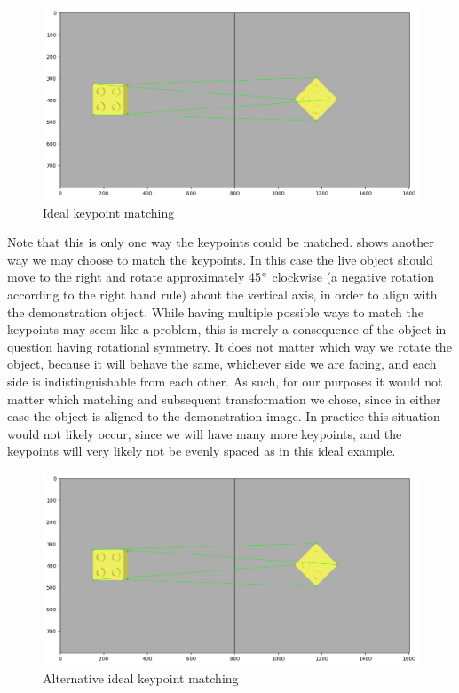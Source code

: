 \begin{figure}[h]
    \centering
    \includegraphics[width=\textwidth]{figures/ideal_matches.png}
    \caption{Ideal keypoint matching}
    \label{fig:ideal-matches}
\end{figure}

Note that this is only one way the keypoints could be matched.  shows another way we may choose to match the keypoints. In this case the live object should move to the right and rotate approximately 45$\operatorname{^{\circ}}$ clockwise (a negative rotation according to the right hand rule) about the vertical axis, in order to align with the demonstration object. While having multiple possible ways to match the keypoints may seem like a problem, this is merely a consequence of the object in question having rotational symmetry. It does not matter which way we rotate the object, because it will behave the same, whichever side we are facing, and each side is indistinguishable from each other. As such, for our purposes it would not matter which matching and subsequent transformation we chose, since in either case the object is aligned to the demonstration image. In practice this situation would not likely occur, since we will have many more keypoints, and the keypoints will very likely not be evenly spaced as in this ideal example.

\begin{figure}[h]
    \centering
    \includegraphics[width=\textwidth]{figures/ideal_matches_inv.png}
    \caption{Alternative ideal keypoint matching}
    \label{fig:ideal-matches-inv}
\end{figure}

